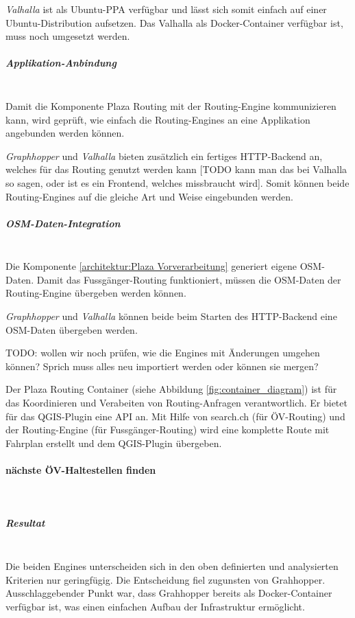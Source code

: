 \emph{Valhalla} ist als Ubuntu-\ac{PPA} verfügbar und lässt sich somit einfach auf einer Ubuntu-Distribution aufsetzen. Das Valhalla als Docker-Container verfügbar ist, muss noch umgesetzt werden.

\subparagraph{Applikation-Anbindung}~\\
\label{architektur:Applikation-Anbindung}
Damit die Komponente Plaza Routing mit der Routing-Engine kommunizieren kann, wird geprüft, wie einfach die Routing-Engines an eine Applikation angebunden werden können. 

\emph{Graphhopper} und \emph{Valhalla} bieten zusätzlich ein fertiges HTTP-Backend an, welches für das Routing genutzt werden kann [TODO kann man das bei Valhalla so sagen, oder ist es ein Frontend, welches missbraucht wird]. Somit können beide Routing-Engines auf die gleiche Art und Weise eingebunden werden.

\subparagraph{OSM-Daten-Integration}~\\
\label{architektur:OSM-Daten-Integration}
Die Komponente \ref{architektur:Plaza Vorverarbeitung} generiert eigene \ac{OSM}-Daten. Damit das Fussgänger-Routing funktioniert, müssen die \ac{OSM}-Daten der Routing-Engine übergeben werden können. 

\emph{Graphhopper} und \emph{Valhalla} können beide beim Starten des HTTP-Backend eine {OSM}-Daten übergeben werden.

TODO: wollen wir noch prüfen, wie die Engines mit Änderungen umgehen können? Sprich muss alles neu importiert werden oder können sie mergen?

Der Plaza Routing Container (siehe Abbildung \ref{fig:container_diagram}) ist für das Koordinieren und Verabeiten von Routing-Anfragen verantwortlich. Er bietet für das QGIS-Plugin eine API an. Mit Hilfe von search.ch (für ÖV-Routing) und der Routing-Engine (für Fussgänger-Routing) wird eine komplette Route mit Fahrplan erstellt und dem QGIS-Plugin übergeben.

\paragraph{nächste ÖV-Haltestellen finden}\label{architektur:nächste ÖV-Haltestellen finden}~\\

\subparagraph{Resultat}~\\
\label{architektur:Resulat}
Die beiden Engines unterscheiden sich in den oben definierten und analysierten Kriterien nur geringfügig. Die Entscheidung fiel zugunsten von Grahhopper. Ausschlaggebender Punkt war, dass Grahhopper bereits als Docker-Container verfügbar ist, was einen einfachen Aufbau der Infrastruktur ermöglicht.

